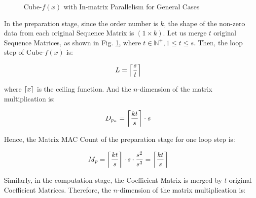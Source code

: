 \documentclass[12pt]{extbook}
\DeclarePairedDelimiter\ceil{\lceil}{\rceil}
\begin{document}
\begin{figure}[t]
    \caption{Cube-$f(x)$ with In-matrix Parallelism for General Cases}
    \label{fig:general}
    \end{figure}

In the preparation stage, since the order number is $k$, the shape of the non-zero data from each original Sequence Matrix is $(1 \times k)$. Let us merge $t$ original Sequence Matrices, as shown in Fig. \ref{fig:general}, where $t \in \mathbb{N}^{+}, 1 \le t \le s$. Then, the loop step of Cube-$f(x)$ is:

\begin{equation}
    \label{eq:gen_1}
    \begin{aligned}
    L = \ceil*{\frac{s}{t}}
    \end{aligned}
    \end{equation}

where $\ceil*{x}$ is the ceiling function. And the $n$-dimension of the matrix multiplication is:

\begin{equation}
    \label{eq:gen_2}
    \begin{aligned}
    D_{p_n} = \ceil*{\frac{kt}{s}} \cdot s
    \end{aligned}
    \end{equation}

Hence, the Matrix MAC Count of the preparation stage for one loop step is:

\begin{equation}
    \label{eq:gen_3}
    \begin{aligned}
    M_{p} = \ceil*{\frac{kt}{s}} \cdot s \cdot \frac{s^2}{s^3} = \ceil*{\frac{kt}{s}}
    \end{aligned}
    \end{equation}

Similarly, in the computation stage, the Coefficient Matrix is merged by $t$ original Coefficient Matrices. Therefore, the $n$-dimension of the matrix multiplication is:
\end{document}
